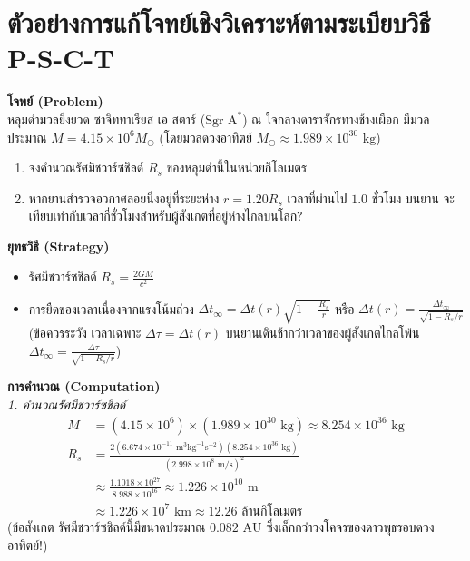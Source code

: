 \section{ตัวอย่างการแก้โจทย์เชิงวิเคราะห์ตามระเบียบวิธี P-S-C-T}

\begin{psctexample}
\textbf{โจทย์ (Problem)} \\
หลุมดำมวลยิ่งยวด ซาจิททาเรียส เอ สตาร์ ($\text{Sgr A}^*$) ณ ใจกลางดาราจักรทางช้างเผือก มีมวลประมาณ $M = 4.15 \times 10^6 M_\odot$ (โดยมวลดวงอาทิตย์ $M_\odot \approx 1.989 \times 10^{30}\text{ kg}$)
\begin{enumerate}
    \item จงคำนวณรัศมีชวาร์ซชิลด์ $R_s$ ของหลุมดำนี้ในหน่วยกิโลเมตร
    \item หากยานสำรวจอวกาศลอยนิ่งอยู่ที่ระยะห่าง $r = 1.20 R_s$ เวลาที่ผ่านไป $1.0\text{ ชั่วโมง}$ บนยาน จะเทียบเท่ากับเวลากี่ชั่วโมงสำหรับผู้สังเกตที่อยู่ห่างไกลบนโลก?
\end{enumerate}

\textbf{ยุทธวิธี (Strategy)} \\
\begin{itemize}
    \item รัศมีชวาร์ซชิลด์ $R_s = \frac{2GM}{c^2}$
    \item การยืดของเวลาเนื่องจากแรงโน้มถ่วง $\Delta t_\infty = \Delta t(r) \sqrt{1 - \frac{R_s}{r}}$ หรือ $\Delta t(r) = \frac{\Delta t_\infty}{\sqrt{1 - R_s/r}}$ \\
    (ข้อควรระวัง เวลาเฉพาะ $\Delta \tau = \Delta t(r)$ บนยานเดินช้ากว่าเวลาของผู้สังเกตไกลโพ้น $\Delta t_\infty = \frac{\Delta \tau}{\sqrt{1 - R_s/r}}$)
\end{itemize}

\textbf{การคำนวณ (Computation)} \\
\textit{1. คำนวณรัศมีชวาร์ซชิลด์}
\begin{align}
M &= (4.15 \times 10^6) \times (1.989 \times 10^{30}\text{ kg}) \approx 8.254 \times 10^{36}\text{ kg} \\
R_s &= \frac{2 (6.674 \times 10^{-11}\text{ m}^3\text{kg}^{-1}\text{s}^{-2}) (8.254 \times 10^{36}\text{ kg})}{(2.998 \times 10^8\text{ m/s})^2} \\
&\approx \frac{1.1018 \times 10^{27}}{8.988 \times 10^{16}} \approx 1.226 \times 10^{10}\text{ m} \nonumber \\
&\approx 1.226 \times 10^7\text{ km} \approx 12.26\text{ ล้านกิโลเมตร}
\end{align}
(ข้อสังเกต รัศมีชวาร์ซชิลด์นี้มีขนาดประมาณ $0.082\text{ AU}$ ซึ่งเล็กกว่าวงโคจรของดาวพุธรอบดวงอาทิตย์!)


\end{psctexample}
